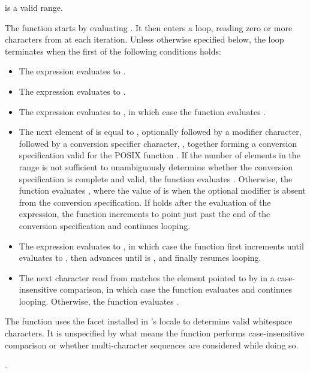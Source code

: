 \begin{itemdescr}
\pnum
\expects
{} is a valid range.

\pnum
\effects
The function starts by evaluating .
It then enters a loop,
reading zero or more characters from  at each iteration.
Unless otherwise specified below,
the loop terminates when the first of the following conditions holds:

\begin{itemize}
\item
The expression  evaluates to .
\item
The expression  evaluates to .
\item
The expression  evaluates to ,
in which case
the function evaluates .
\item
The next element of  is equal to ,
optionally followed by a modifier character,
followed by a conversion specifier character, ,
together forming a conversion specification
valid for the POSIX function .
If the number of elements in the range 
is not sufficient to unambiguously determine
whether the conversion specification is complete and valid,
the function evaluates .
Otherwise,
the function evaluates ,
where the value of  is 
when the optional modifier is absent from the conversion specification.
If  holds
after the evaluation of the expression,
the function increments 
to point just past the end of the conversion specification and
continues looping.

\item
The expression  evaluates to ,
in which case the function first increments  until
 evaluates to ,
then advances 
until  is , and
finally resumes looping.

\item
The next character read from 
matches the element pointed to by  in a case-insensitive comparison,
in which case the function evaluates  and continues looping.
Otherwise, the function evaluates .
\end{itemize}

\pnum
\begin{note}
The function uses the  facet
installed in 's locale
to determine valid whitespace characters.
It is unspecified
by what means the function performs case-insensitive comparison or
whether multi-character sequences are considered while doing so.
\end{note}

\pnum
\returns
{}.
\end{itemdescr}

